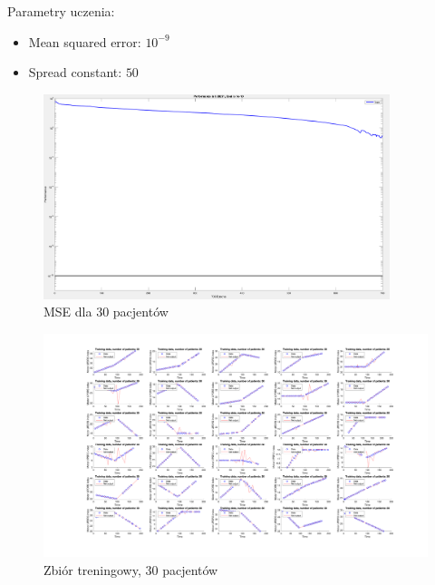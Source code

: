 \documentclass[12pt]{article}
\begin{document}
Parametry uczenia:
\begin{itemize}
\item Mean squared error: $10^{-9}$
\item Spread constant: $50$
\end{itemize}

\newpage

\begin{figure}[h!]

\centering
\includegraphics[width=0.9\textwidth]{mse-cut-30.png}
\caption{MSE dla 30 pacjentów}

\end{figure}

\begin{figure}[h!]

\centering
\includegraphics[width=1.05\textwidth]{training-cut-30.png}
\caption{Zbiór treningowy, 30 pacjentów}

\end{figure}
\end{document}
